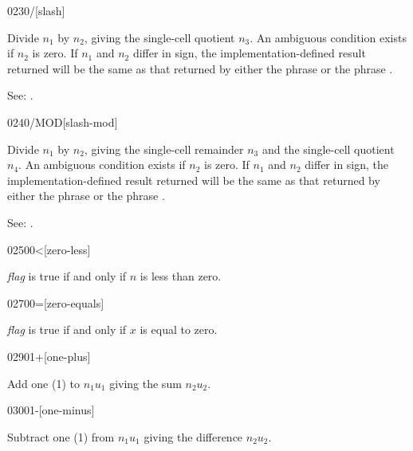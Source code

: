 \begin{newword}{0230}{/}[slash]

	Divide $n_1$ by $n_2$, giving the single-cell quotient $n_3$.
	An ambiguous condition exists if $n_2$ is zero. If $n_1$ and
	$n_2$ differ in sign, the implementation-defined result returned
	will be the same as that returned by either the phrase
	   
	  or the phrase  
	   .

\item[See:]
	.
\end{newword}


\begin{newword}{0240}{/MOD}[slash-mod]

	Divide $n_1$ by $n_2$, giving the single-cell remainder $n_3$
	and the single-cell quotient $n_4$. An ambiguous condition exists
	if $n_2$ is zero. If $n_1$ and $n_2$ differ in sign, the
	implementation-defined result returned will be the same as that
	returned by either the phrase
	   
	or the phrase
	   .

\item[See:]
	.
\end{newword}


\begin{newword}[0less]{0250}{0<}[zero-less]

	\emph{flag} is true if and only if $n$ is less than zero.
\end{newword}


\begin{newword}{0270}{0=}[zero-equals]

	\emph{flag} is true if and only if $x$ is equal to zero.
\end{newword}


\begin{newword}{0290}{1+}[one-plus]

	Add one (1) to $n_1$\textbar$u_1$ giving the sum
	$n_2$\textbar$u_2$.
\end{newword}


\begin{newword}{0300}{1-}[one-minus]

	Subtract one (1) from $n_1$\textbar$u_1$ giving the difference
	$n_2$\textbar$u_2$.
\end{newword}


